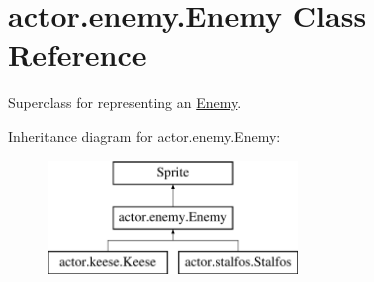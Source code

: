 \hypertarget{classactor_1_1enemy_1_1_enemy}{}\section{actor.\+enemy.\+Enemy Class Reference}
\label{classactor_1_1enemy_1_1_enemy}


Superclass for representing an \hyperlink{classactor_1_1enemy_1_1_enemy}{Enemy}.  


Inheritance diagram for actor.\+enemy.\+Enemy\+:\begin{figure}[H]
\begin{center}
\leavevmode
\includegraphics[height=3.000000cm]{classactor_1_1enemy_1_1_enemy}
\end{center}
\end{figure}
